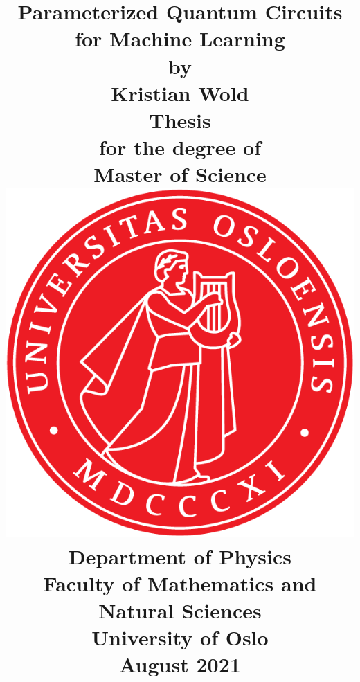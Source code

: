 \title{
    \Large \textbf{Parameterized Quantum Circuits for Machine Learning}
    \\[8 pt]
    \large by
    \\ [8 pt]
    \large Kristian Wold
    \\ [40 pt]
    \large \textbf{Thesis}
    \\ [8 pt]
    \large for the degree of
    \\ [8 pt]
    \large \textbf{Master of Science}
    \\ [30 pt]
    \includegraphics[scale=0.9]{latex/latex-report/3_Images/Logo/UiO/UiO_Segl_300dpi.png}
    \\ [30 pt]
    \large Department of Physics
    \\ [8 pt]
    \large Faculty of Mathematics and Natural Sciences
    \\ [8 pt]
    \large University of Oslo
    \\ [15 pt]
    \large August 2021
}%

\author{\vspace{-5ex}}
\date{\vspace{-5ex}}


\maketitle